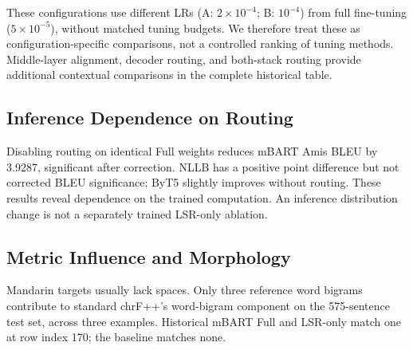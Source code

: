 \documentclass[11pt]{article}
\begin{document}
These configurations use different LRs (A: $2\times10^{-4}$; B: $10^{-4}$) from full fine-tuning ($5\times10^{-5}$), without matched tuning budgets. We therefore treat these as configuration-specific comparisons, not a controlled ranking of tuning methods. Middle-layer alignment, decoder routing, and both-stack routing provide additional contextual comparisons in the complete historical table.

\subsection{Inference Dependence on Routing}
\begin{table}[!ht]
\centering
\caption{Inference routing sensitivity (B): identical CLRR+LSR weights with $\alpha=0.1$ or 0. Removing a route changes the trained computation and is not a separately trained LSR-only ablation.}
\label{tab:routing}
\renewcommand{\arraystretch}{1.15}
\end{table}
Disabling routing on identical Full weights reduces mBART Amis BLEU by 3.9287, significant after correction. NLLB has a positive point difference but not corrected BLEU significance; ByT5 slightly improves without routing. These results reveal dependence on the trained computation. An inference distribution change is not a separately trained LSR-only ablation.

\subsection{Metric Influence and Morphology}
\label{sec:influence}
Mandarin targets usually lack spaces. Only three reference word bigrams contribute to standard chrF++'s word-bigram component on the 575-sentence test set, across three examples. Historical mBART Full and LSR-only match one at row index 170; the baseline matches none.
\end{document}
